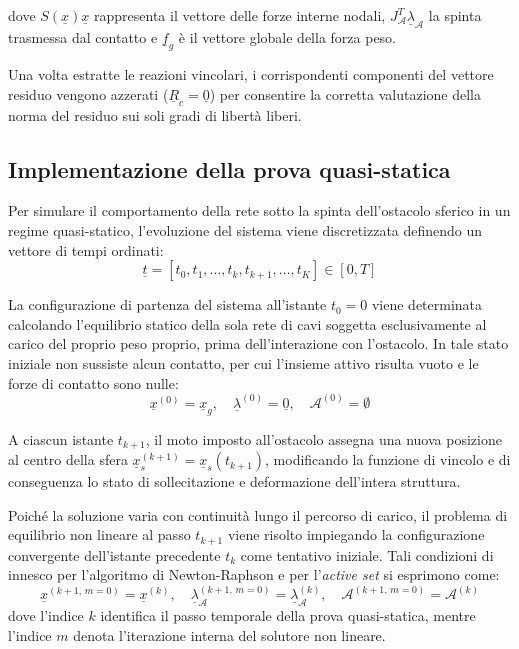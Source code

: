 dove $S(\underline{x})\underline{x}$ rappresenta il vettore delle forze interne nodali, $J_{\mathcal{A}}^T \underline{\lambda}_{\mathcal{A}}$ la spinta trasmessa dal contatto e $\underline{f}_{g}$ è il vettore globale della forza peso. 

Una volta estratte le reazioni vincolari, i corrispondenti componenti del vettore residuo vengono azzerati ($\underline{R}_c = \underline{0}$) per consentire la corretta valutazione della norma del residuo sui soli gradi di libertà liberi.

\subsection{Implementazione della prova quasi-statica}
Per simulare il comportamento della rete sotto la spinta dell'ostacolo sferico in un regime quasi-statico, l'evoluzione del sistema viene discretizzata definendo un vettore di tempi ordinati:
\begin{equation}
\underline{t} = \left[ t_0, t_1, \dots, t_k, t_{k+1}, \dots, t_{K} \right] \in [0, T]
\end{equation}

La configurazione di partenza del sistema all'istante $t_0 = 0$ viene determinata calcolando l'equilibrio statico della sola rete di cavi soggetta esclusivamente al carico del proprio peso proprio, prima dell'interazione con l'ostacolo. In tale stato iniziale non sussiste alcun contatto, per cui l'insieme attivo risulta vuoto e le forze di contatto sono nulle:
\begin{equation}
\underline{x}^{(0)} = \underline{x}_{g}, \quad \underline{\lambda}^{(0)} = \underline{0}, \quad \mathcal{A}^{(0)} = \emptyset
\end{equation}

A ciascun istante $t_{k+1}$, il moto imposto all'ostacolo assegna una nuova posizione al centro della sfera $\underline{x}_s^{(k+1)} = \underline{x}_s(t_{k+1})$, modificando la funzione di vincolo e di conseguenza lo stato di sollecitazione e deformazione dell'intera struttura.

Poiché la soluzione varia con continuità lungo il percorso di carico, il problema di equilibrio non lineare al passo $t_{k+1}$ viene risolto impiegando la configurazione convergente dell'istante precedente $t_k$ come tentativo iniziale. Tali condizioni di innesco per l'algoritmo di Newton-Raphson e per l'\textit{active set} si esprimono come:
\begin{equation}
\underline{x}^{(k+1, \, m=0)} = \underline{x}^{(k)}, \quad \underline{\lambda}_{\mathcal{A}}^{(k+1, \, m=0)} = \underline{\lambda}_{\mathcal{A}}^{(k)}, \quad \mathcal{A}^{(k+1, \, m=0)} = \mathcal{A}^{(k)}
\end{equation}
dove l'indice $k$ identifica il passo temporale della prova quasi-statica, mentre l'indice $m$ denota l'iterazione interna del solutore non lineare. 

